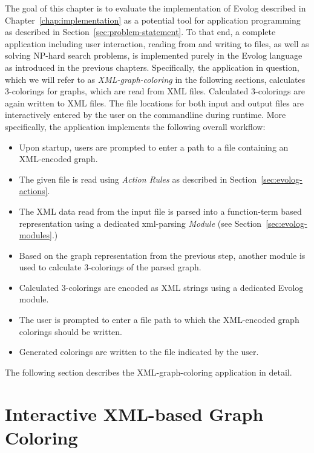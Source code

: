 The goal of this chapter is to evaluate the implementation of Evolog described in Chapter~\ref{chap:implementation} as a potential tool for application programming as described in Section~\ref{sec:problem-statement}. To that end, a complete application including user interaction, reading from and writing to files, as well as solving NP-hard search problems, is implemented purely in the Evolog language as introduced in the previous chapters.
Specifically, the application in question, which we will refer to as \emph{XML-graph-coloring} in the following sections, calculates 3-colorings for graphs, which are read from XML files. Calculated 3-colorings are again written to XML files. The file locations for both input and output files are interactively entered by the user on the commandline during runtime. More specifically, the application implements the following overall workflow:
\begin{itemize}
    \item Upon startup, users are prompted to enter a path to a file containing an XML-encoded graph.
    \item The given file is read using \emph{Action Rules} as described in Section~\ref{sec:evolog-actions}.
    \item The XML data read from the input file is parsed into a function-term based representation using a dedicated xml-parsing \emph{Module} (see Section~\ref{sec:evolog-modules}.)
    \item Based on the graph representation from the previous step, another module is used to calculate 3-colorings of the parsed graph.
    \item Calculated 3-colorings are encoded as XML strings using a dedicated Evolog module.
    \item The user is prompted to enter a file path to which the XML-encoded graph colorings should be written.
    \item Generated colorings are written to the file indicated by the user.
\end{itemize}    
The following section describes the XML-graph-coloring application in detail.

\section{Interactive XML-based Graph Coloring}
\label{sec:results-xml-graphcol}

